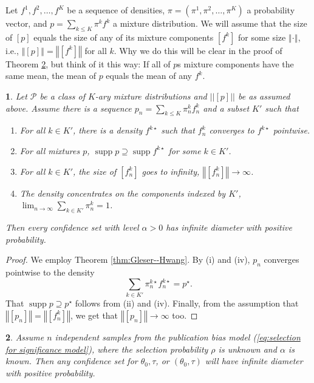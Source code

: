 \documentclass[article]{ajs}
\numberwithin{equation}{section}
\numberwithin{figure}{section}
\theoremstyle{plain}
\newtheorem{thm}{\protect\theoremname}
\theoremstyle{definition}
\theoremstyle{definition}
\theoremstyle{plain}
\newtheorem{lem}[thm]{\protect\lemmaname}
\providecommand{\lemmaname}{Lemma}
\providecommand{\theoremname}{Theorem}
\DeclareMathOperator{\supp}{supp}
\begin{document}
Let $f^{1},f^{2},\ldots,f^{K}$ be a sequence of densities, $\pi=(\pi^{1},\pi^{2},\ldots,\pi^{K})$
a probability vector, and $p=\sum_{k\leq K}\pi^{k}f^{k}$ a mixture
distribution. We will assume that the size of $[p]$ equals the size
of any of its mixture components $[f^{k}]$ for some size $\left\Vert \cdot\right\Vert $,
i.e., $\left\Vert [p]\right\Vert =\left\Vert [f^{k}]\right\Vert $
for all $k$. Why we do this will be clear in the proof of Theorem
\ref{thm:general publication bias}, but think of it this way: If
all of $p$s mixture components have the same mean, the mean of $p$
equals the mean of any $f^{k}$. 
\begin{lem}
\label{prop:Mixture model corollary} Let $\mathcal{P}$ be a class
of $K$-ary mixture distributions and $||[p]||$ be as assumed above. Assume there is a sequence $p_{n}=\sum_{k\leq K}\pi_{n}^{k}f_{n}^{k}$
and a subset $K'$ such that 
\begin{enumerate}
\item For all $k\in K'$, there is a density $f^{k\star}$ such that $f_{n}^{k}$
converges to $f^{k\star}$ pointwise.
\item For all mixtures $p$, $\supp p\supseteq\supp f^{k\star}$ for some
$k\in K'$.
\item For all $k\in K'$, the size of $[f_{n}^{k}]$ goes to infinity, $\left\Vert [f_{n}^{k}]\right\Vert \to\infty$.
\item The density concentrates on the components indexed by $K'$, $\lim_{n\to\infty}\sum_{k\in K'}\pi_{n}^{k}=1$.
\end{enumerate}
Then every confidence set with level $\alpha>0$ has infinite diameter
with positive probability.
\end{lem}

\begin{proof}
We employ Theorem \ref{thm:Gleser--Hwang}. By (i) and (iv), $p_{n}$
converges pointwise to the density $$\sum_{k\in K'}\pi_{n}^{k\star}f_{n}^{k\star}=p^{\star}.$$
That $\supp p\supseteq p^{\star}$ follows from (ii) and (iv). Finally,
from the assumption that$\left\Vert [p_{n}]\right\Vert =\left\Vert [f_{n}^{k}]\right\Vert $,
we get that $\left\Vert [p_{n}]\right\Vert \to\infty$ too. 
\end{proof}
\begin{thm}
\label{thm:general publication bias} Assume $n$ independent samples
from the publication bias model (\ref{eq:selection for significance model}),
where the selection probability $\rho$ is unknown and $\alpha$ is
known. Then any confidence set for $\theta_{0},\tau$, or $(\theta_{0},\tau)$
will have infinite diameter with positive probability.
\end{thm}
\end{document}
